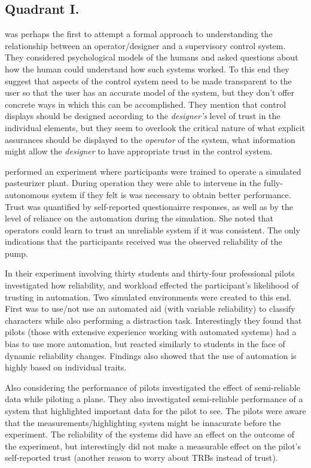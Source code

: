 \subsection{Quadrant I.}
\citet{Sheridan1984-kx} was perhaps the first to attempt a formal approach to understanding the relationship between an operator/designer and a supervisory control system. They considered psychological models of the humans and asked questions about how the human could understand how such systems worked. To this end they suggest that aspects of the control system need to be made transparent to the user so that the user has an accurate model of the system, but they don't offer concrete ways in which this can be accomplished. They mention that control displays should be designed according to the \emph{designer's} level of trust in the individual elements, but they seem to overlook the critical nature of what explicit assurances should be displayed to the \emph{operator} of the system, what information might allow the \emph{designer} to have appropriate trust in the control system.

\citet{Muir1996-gt} performed an experiment where participants were trained to operate a simulated pasteurizer plant. During operation they were able to intervene in the fully-autonomous system if they felt is was necessary to obtain better performance. Trust was quantified by self-reported questionairre responses, as well as by the level of reliance on the automation during the simulation. She noted that operators could learn to trust an unreliable system if it was consistent. The only indications that the participants received was the observed reliability of the pump. 

In their experiment involving thirty students and thirty-four professional pilots \citet{Riley1996-qm} investigated how reliability, and workload effected the participant's likelihood of trusting in automation. Two simulated environments were created to this end. First was to use/not use an automated aid (with variable reliability) to classify characters while also performing a distraction task. Interestingly they found that pilots (those with extensive experience working with automated systems) had a bias to use more automation, but reacted similarly to students in the face of dynamic reliability changes. Findings also showed that the use of automation is highly based on individual traits.

Also considering the performance of pilots \citet{Wickens1999-la} investigated the effect of semi-reliable data while piloting a plane. They also investigated semi-reliable performance of a system that highlighted important data for the pilot to see. The pilots were aware that the measurements/highlighting system might be innacurate before the experiment. The reliability of the systems did have an effect on the outcome of the experiment, but interestingly did not make a measurable effect on the pilot's self-reported trust (another reason to worry about TRBs instead of trust).

